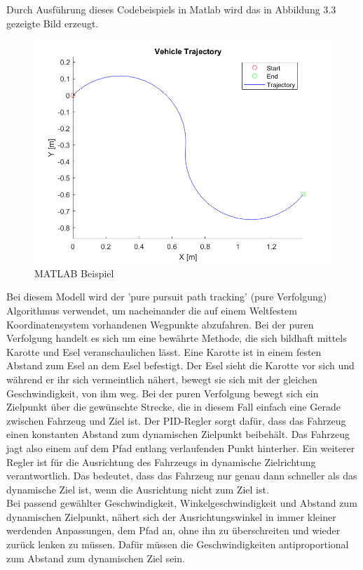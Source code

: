 Durch Ausführung dieses Codebeispiels in Matlab wird das in Abbildung 3.3 gezeigte Bild erzeugt. 
\begin{figure}[htb] 
  \includegraphics[scale=0.8]{img/einacherPfad.png}
  \caption{MATLAB Beispiel}
  \label{fig:MATLAB Beispiel}
\end{figure}
Bei diesem Modell wird der 'pure pursuit path tracking' (pure Verfolgung) Algorithmus verwendet, um nacheinander die auf einem Weltfestem Koordinatensystem vorhandenen Wegpunkte abzufahren. Bei der puren Verfolgung handelt es sich um eine bewährte Methode, die sich bildhaft mittels Karotte und Esel veranschaulichen lässt. Eine Karotte ist in einem festen Abstand zum Esel an dem Esel befestigt. Der Esel sieht die Karotte vor sich und während er ihr sich vermeintlich nähert, bewegt sie sich mit der gleichen Geschwindigkeit, von ihm weg. Bei der puren Verfolgung bewegt sich ein Zielpunkt über die gewünschte Strecke, die in diesem Fall einfach eine Gerade zwischen Fahrzeug und Ziel ist. Der PID-Regler sorgt dafür, dass das Fahrzeug einen konstanten Abstand zum dynamischen Zielpunkt beibehält. Das Fahrzeug jagt also einem auf dem Pfad entlang verlaufenden Punkt hinterher. Ein weiterer Regler ist für die Ausrichtung des Fahrzeugs in dynamische Zielrichtung verantwortlich. Das bedeutet, dass das Fahrzeug nur genau dann schneller als das dynamische Ziel ist, wenn die Ausrichtung nicht zum Ziel ist. \\
Bei passend gewählter Geschwindigkeit, Winkelgeschwindigkeit und Abstand zum dynamischen Zielpunkt, nähert sich der Ausrichtungswinkel in immer kleiner werdenden Anpassungen, dem Pfad an, ohne ihn zu überschreiten und wieder zurück lenken zu müssen. Dafür müssen die Geschwindigkeiten antiproportional zum Abstand zum dynamischen Ziel sein. \\
